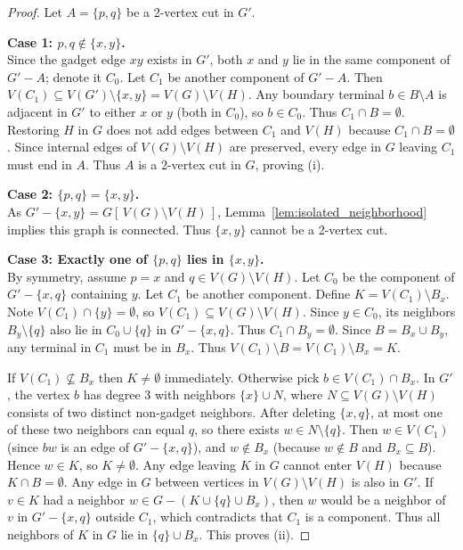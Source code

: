 \documentclass[12pt]{article}
\begin{document}
\begin{proof}
Let $A = \{p, q\}$ be a 2-vertex cut in $G'$.

\medskip
\noindent\textbf{Case 1: $p, q \notin \{x, y\}$.} \\
Since the gadget edge $xy$ exists in $G'$, both $x$ and $y$ lie in the same component of $G' - A$; denote it $C_0$. Let $C_1$ be another component of $G' - A$.
Then $V(C_1) \subseteq V(G') \setminus \{x, y\} = V(G) \setminus V(H)$.
Any boundary terminal $b \in B \setminus A$ is adjacent in $G'$ to either $x$ or $y$ (both in $C_0$), so $b \in C_0$. Thus $C_1 \cap B = \emptyset$.
Restoring $H$ in $G$ does not add edges between $C_1$ and $V(H)$ because $C_1 \cap B = \emptyset$. Since internal edges of $V(G) \setminus V(H)$ are preserved, every edge in $G$ leaving $C_1$ must end in $A$. Thus $A$ is a 2-vertex cut in $G$, proving (i).

\medskip
\noindent\textbf{Case 2: $\{p, q\} = \{x, y\}$.} \\
As $G' - \{x, y\} = G[\,V(G) \setminus V(H)\,]$, Lemma~\ref{lem:isolated_neighborhood} implies this graph is connected. Thus $\{x, y\}$ cannot be a 2-vertex cut.

\medskip
\noindent\textbf{Case 3: Exactly one of $\{p, q\}$ lies in $\{x, y\}$.} \\
By symmetry, assume $p = x$ and $q \in V(G) \setminus V(H)$.
Let $C_0$ be the component of $G' - \{x, q\}$ containing $y$. Let $C_1$ be another component.
Define $K = V(C_1) \setminus B_x$. 
Note $V(C_1) \cap \{y\} = \emptyset$, so $V(C_1) \subseteq V(G) \setminus V(H)$.
Since $y \in C_0$, its neighbors $B_y \setminus \{q\}$ also lie in $C_0 \cup \{q\}$ in $G' - \{x, q\}$. Thus $C_1 \cap B_y = \emptyset$.
Since $B = B_x \cup B_y$, any terminal in $C_1$ must be in $B_x$. Thus $V(C_1) \setminus B = V(C_1) \setminus B_x = K$.

If $V(C_1)\nsubseteq B_x$ then $K\neq\emptyset$ immediately. Otherwise pick $b\in V(C_1)\cap B_x$.
In $G'$, the vertex $b$ has degree $3$ with neighbors $\{x\}\cup N$, where $N\subseteq V(G)\setminus V(H)$ consists of two distinct non-gadget neighbors.
After deleting $\{x,q\}$, at most one of these two neighbors can equal $q$, so there exists $w\in N\setminus\{q\}$.
Then $w\in V(C_1)$ (since $bw$ is an edge of $G'-\{x,q\}$), and $w\notin B_x$ (because $w\notin B$ and $B_x\subseteq B$).
Hence $w\in K$, so $K\neq\emptyset$.
Any edge leaving $K$ in $G$ cannot enter $V(H)$ because $K \cap B = \emptyset$. Any edge in $G$ between vertices in $V(G) \setminus V(H)$ is also in $G'$. If $v \in K$ had a neighbor $w \in G - (K \cup \{q\} \cup B_x)$, then $w$ would be a neighbor of $v$ in $G' - \{x, q\}$ outside $C_1$, which contradicts that $C_1$ is a component. Thus all neighbors of $K$ in $G$ lie in $\{q\} \cup B_x$. This proves (ii).
\end{proof}
\end{document}
